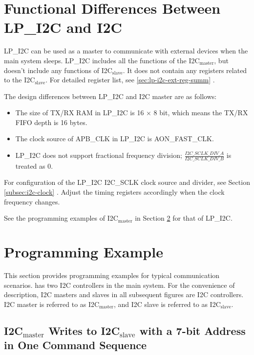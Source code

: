 \documentclass[main\_\_EN.tex]{subfiles}
\begin{document}
\section{Functional Differences Between LP\_I2C and I2C}\label{sec:i2c-hplp-diff}

LP\_I2C can be used as a master to communicate with external devices when the main system sleeps. LP\_I2C includes all the functions of the \chipname{} I2C$_\text{master}$, but doesn't include any functions of \chipname{} I2C$_\text{slave}$. It does not contain any registers related to the I2C$_\text{slave}$. For detailed register list, see \ref{sec:lp-i2c-ext-reg-summ} .

The design differences between LP\_I2C and I2C master are as follows:

\begin{itemize}
\item The size of TX/RX RAM in LP\_I2C is 16 × 8 bit, which means the TX/RX FIFO depth is 16 bytes.
\item The clock source of APB\_CLK in LP\_I2C is AON\_FAST\_CLK.
\item LP\_I2C does not support fractional frequency division; $\frac{I2C\_SCLK\_DIV\_A}{I2C\_SCLK\_DIV\_B}$ is treated as 0.
\end{itemize}

For configuration of the LP\_I2C I2C\_SCLK clock source and divider, see Section \ref{subsec:i2c-clock} \textit{}. Adjust the timing registers accordingly when the clock frequency changes.

See the programming examples of \chipname{} I2C$_\text{master}$ in Section \ref{subsec:i2c-prom-guide} for that of LP\_I2C.

\section{Programming Example}\label{subsec:i2c-prom-guide}
This section provides programming examples for typical communication scenarios. \chipname{} has two I2C controllers in the main system. For the convenience of description, I2C masters and slaves in all subsequent figures are \chipname{} I2C controllers. I2C master is referred to as I2C$_\text{master}$, and I2C slave is referred to as I2C$_\text{slave}$.

\subsection{\texorpdfstring{I2C$_\text{master}$ Writes to I2C$_\text{slave}$ with a 7-bit Address in One Command Sequence}{I2C master Writes to I2C slave with a 7-bit Address in One Command Sequence}}\label{subsec:i2c-mws7}
\end{document}
